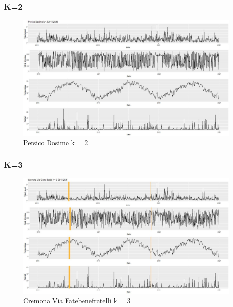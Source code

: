 \documentclass{article}
\begin{document}
\subsubsection{K=2}
\begin{figure}[H]
  \centering 
  \includegraphics[scale = 0.3]{Picture/2/Persico Dosimo k= 2 2018 2020 .jpeg}
  \caption{Persico Dosimo k = 2}
  \centering
\end{figure}
\subsubsection{K=3}
\begin{figure}[H]
  \centering 
  \includegraphics[scale = 0.3]{Picture/3/Cremona Via Gerre Borghi k= 3 2018 2020 .jpeg}
  \caption{Cremona Via Fatebenefratelli k = 3}
  \centering
\end{figure}
\end{document}
